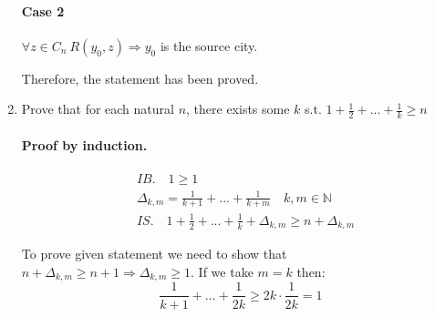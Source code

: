 \documentclass{article}
\begin{document}
\begin{enumerate}
\paragraph{Case 2}
$\forall z \in C_n \: R(y_0, z) \Rightarrow y_0 $ is the source city.

Therefore, the statement has been proved.

\item Prove that for each natural $n$, there exists some $k$ s.t. $1 + \frac{1}{2} + ... + \frac{1}{k} \geq n$

\paragraph{Proof by induction.}
\begin{align*}
&IB. \quad 1 \geq 1\\
&\Delta_{k,m} = \frac{1}{k+1} + ... + \frac{1}{k+m} \quad k, m \in \mathbb{N}\\
&IS. \quad 1 + \frac{1}{2} + ... + \frac{1}{k} + \Delta_{k,m} \geq n + \Delta_{k,m}
\end{align*}

To prove given statement we need to show that $n + \Delta_{k,m} \geq n + 1 \Rightarrow \Delta_{k,m} \geq 1$. If we take $m = k$ then:
\[\frac{1}{k+1} + ... + \frac{1}{2k} \geq 2k \cdot \frac{1}{2k} = 1\]

\end{enumerate}
\end{document}
